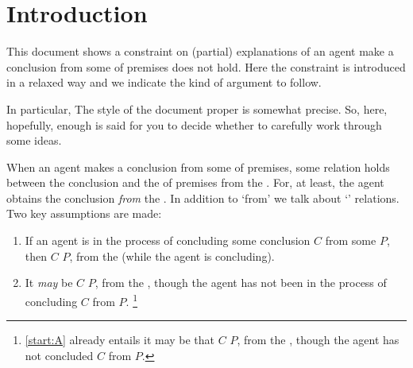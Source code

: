 \chapter{Introduction}
\label{cha:introduction}


\begin{note}
  This document shows a constraint on (partial) explanations of  an agent make a conclusion from some \pool{} of premises does not hold.
  Here the constraint is introduced in a relaxed way and we indicate the kind of argument to follow.

  In particular, The style of the document proper is somewhat precise.
  So, here, hopefully, enough is said for you to decide whether to carefully work through some ideas.
\end{note}


\begin{note}
  When an agent makes a conclusion from some \pool{} of premises, some relation holds between the conclusion and the \pool{} of premises from the \agpe{}.
  For, at least, the agent obtains the conclusion \emph{from} the \pool{}.
  In addition to `from' we talk about `' relations.
  Two key assumptions are made:
  \begin{enumerate}[label=\Alph*., ref=(\Alph*)]
  \item
    \label{start:A}
    If an agent is in the process of concluding some conclusion \(C\) from some \pool{} \(P\), then \(C\) \fof{} \(P\), from the \agpe{} (while the agent is concluding).
  \item
    \label{start:B}
    It \emph{may} be \(C\) \fof{} \(P\), from the \agpe{}, though the agent has not been in the process of concluding \(C\) from \(P\).%
    \footnote{
      \ref{start:A} already entails it may be that \(C\) \fof{} \(P\), from the \agpe{}, though the agent has not concluded \(C\) from \(P\).
    }
  \end{enumerate}
\end{note}

